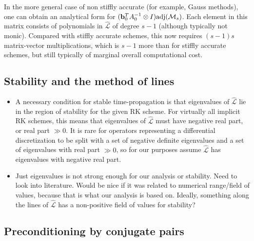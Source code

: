 \documentclass[review]{siamart}
\begin{document}
In the more general case of non stiffly accurate (for example, Gauss methods), one can
obtain an analytical form for
$(\mathbf{b}_0^TA_0^{-1}\otimes I)\textnormal{adj}(\mathcal{M}_s)$. Each element in
this matrix consists of polynomials in $\widehat{\mathcal{L}}$ of degree $s-1$ (although
typically not monic). Compared with stiffly accurate schemes, this now requires 
$(s-1)s$ matrix-vector multiplications, which is $s-1$ more than for stiffly
accurate schemes, but still typically of marginal overall computational cost. 

\subsection{Stability and the method of lines}\label{sec:solve:stab}

{\color{blue}
\begin{itemize}

\item A necessary condition for stable time-propagation is that eigenvalues of $\widehat{\mathcal{L}}$
lie in the region of stability for the given RK scheme. For virtually all implicit RK schemes,
this means that eigenvalues of $\widehat{\mathcal{L}}$ must have negative real part, or real part
$\gg 0$. It is rare for operators representing a differential discretization to be split
with a set of negative definite eigenvalues and a set of eigenvalues with real part $\gg 0$,
so for our purposes assume $\widehat{\mathcal{L}}$ has eigenvalues with negative real part.

\item Just eigenvalues is not strong enough for our analysis or stability. Need to look
into literature. Would be nice if it was related to numerical range/field of values, because
that is what our analysis is based on. Ideally, something along the lines of $\widehat{\mathcal{L}}$ 
has a non-positive field of values for stability? 
\end{itemize}
}


\subsection{Preconditioning by conjugate pairs}\label{sec:solve:prec}
\end{document}
